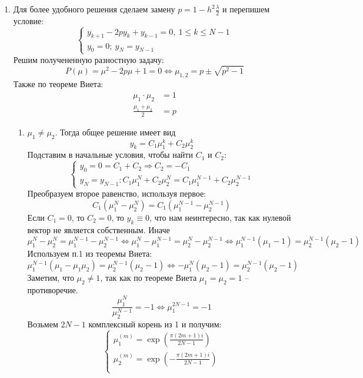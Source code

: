 \begin{enumerate}
  \item Для более удобного решения сделаем замену $p=1-h^2\frac{\lambda}{2}$ и перепишем условие:
        \[\begin{cases}
            y_{k+1}-2py_k+y_{k-1} = 0,\ 1 \leq k \leq N-1 \\
            y_0 = 0;\ y_N = y_{N-1}
          \end{cases}\]
        Решим получененную разностную задачу:
        \[P(\mu) = \mu^2-2p\mu+1 = 0 \Leftrightarrow \mu_{1,2}=p \pm \sqrt{p^2-1}\]
        Также по теореме Виета:
        \begin{align}
          \mu_1\cdot \mu_2      & =1  \\
          \frac{\mu_1+\mu_2}{2} & = p
        \end{align}
        \begin{enumerate}
          \item $\mu_1\neq\mu_2$. Тогда общее решение имеет вид
                \[y_k=C_1\mu_1^k+C_2\mu_2^k\]
                Подставим в начальные условия, чтобы найти $C_1$ и $C_2$:
                \[\begin{cases}
                    y_0 = 0 = C_1+C_2\Rightarrow C_2=-C_1 \\
                    y_N=y_{N-1}: C_1\mu_1^N+C_2\mu_2^N = C_1\mu_1^{N-1}+C_2\mu_2^{N-1}
                  \end{cases}\]
                Преобразуем второе равенство, используя первое:
                \[C_1(\mu_1^N-\mu_2^N)=C_1(\mu_1^{N-1}-\mu_2^{N-1})\]
                Если $C_1 = 0$, то $C_2=0$, то $y_k\equiv 0$, что нам неинтересно, так как нулевой вектор не является собственным. Иначе
                \[\mu_1^N-\mu_2^N=\mu_1^{N-1}-\mu_2^{N-1} \Leftrightarrow
                  \mu_1^N-\mu_1^{N-1}=\mu_2^N-\mu_2^{N-1} \Leftrightarrow
                  \mu_1^{N-1}(\mu_1-1)=\mu_2^{N-1}(\mu_2-1)\]
                Используем п.1 из теоремы Виета:
                \[\mu_1^{N-1}(\mu_1-\mu_1\mu_2)=\mu_2^{N-1}(\mu_2-1)\Leftrightarrow-\mu_1^N(\mu_2-1)=\mu_2^{N-1}(\mu_2-1)\]
                Заметим, что $\mu_2\neq 1$, так как по теореме Виета $\mu_1=\mu_2=1$ -- противоречие.
                \[\frac{\mu_1^N}{\mu_2^{N-1}}=-1\Leftrightarrow\mu_1^{2N-1}=-1\]
                Возьмем $2N-1$ комплексный корень из 1 и получим:
                \[\begin{cases}
                    \mu_1^{(m)} = \exp(\frac{\pi(2m+1)i}{2N-1})  \\
                    \mu_2^{(m)} = \exp(-\frac{\pi(2m+1)i}{2N-1}) \\

\end{cases}\]
\end{enumerate}
\end{enumerate}
